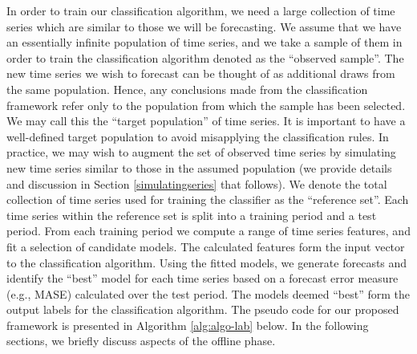 \documentclass[11pt,a4paper,]{article}
\begin{document}
In order to train our classification algorithm, we need a large collection of time series which are similar to those we will be forecasting. We assume that we have an essentially infinite population of time series, and we take a sample of them in order to train the classification algorithm denoted as the ``observed sample''. The new time series we wish to forecast can be thought of as additional draws from the same population. Hence, any conclusions made from the classification framework refer only to the population from which the sample has been selected. We may call this the ``target population'' of time series. It is important to have a well-defined target population to avoid misapplying the classification rules. In practice, we may wish to augment the set of observed time series by simulating new time series similar to those in the assumed population (we provide details and discussion in Section \ref{simulatingseries} that follows). We denote the total collection of time series used for training the classifier as the ``reference set''.
Each time series within the reference set is split into a training period and a test period. From each training period we compute a range of time series features, and fit a selection of candidate models. The calculated features form the input vector to the classification algorithm. Using the fitted models, we generate forecasts and identify the ``best'' model for each time series based on a forecast error measure (e.g., MASE) calculated over the test period. The models deemed ``best'' form the output labels for the classification algorithm. The pseudo code for our proposed framework is presented in Algorithm \ref{alg:algo-lab} below. In the following sections, we briefly discuss aspects of the offline phase.
\end{document}
